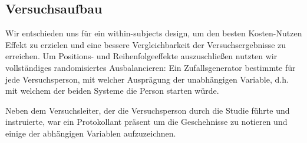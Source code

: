 \subsection{Versuchsaufbau}
Wir entschieden uns für ein within-subjects design, um den besten Kosten-Nutzen Effekt zu erzielen und eine bessere Vergleichbarkeit der Versuchsergebnisse zu erreichen. Um Positions- und Reihenfolgeeffekte auszuschließen nutzten wir vollständiges randomisiertes Ausbalancieren: Ein Zufallsgenerator bestimmte für jede Versuchsperson, mit welcher Ausprägung der unabhängigen Variable, d.h. mit welchem der beiden Systeme die Person starten würde.

Neben dem Versuchsleiter, der die Versuchsperson durch die Studie führte und instruierte, war ein Protokollant präsent um die Geschehnisse zu notieren und einige der abhängigen Variablen aufzuzeichnen. 